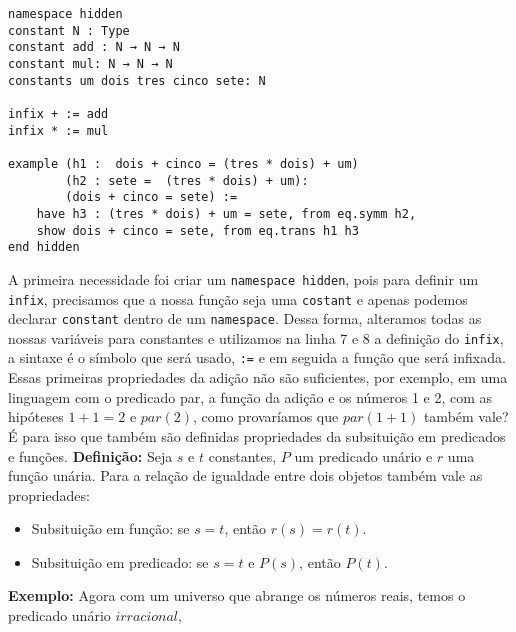 \begin{lstlisting}
namespace hidden
constant N : Type
constant add : N → N → N
constant mul: N → N → N
constants um dois tres cinco sete: N
    
infix + := add
infix * := mul
    
example (h1 :  dois + cinco = (tres * dois) + um) 
        (h2 : sete =  (tres * dois) + um): 
        (dois + cinco = sete) :=
    have h3 : (tres * dois) + um = sete, from eq.symm h2,
    show dois + cinco = sete, from eq.trans h1 h3
end hidden 
\end{lstlisting}
A primeira necessidade foi criar um \lstinline{namespace hidden}, pois para definir um \lstinline{infix},
precisamos que a nossa função seja uma \lstinline{costant} e apenas podemos declarar \lstinline{constant}
dentro de um \lstinline{namespace}. Dessa forma, alteramos todas as nossas variáveis para constantes e 
utilizamos na linha 7 e 8 a definição do \lstinline{infix}, a sintaxe é o símbolo que será usado, \lstinline{:=}
e em seguida a função que será infixada.
Essas primeiras propriedades da adição não são suficientes, por exemplo, em uma linguagem com o predicado
par, a função da adição e os números 1 e 2, com as hipóteses $1+1 =2$ e $par(2)$, como provaríamos que 
$par(1+1)$ também vale? É para isso que também são definidas propriedades da subsituição em predicados e funções.
\newline \textbf{Definição:} Seja $s$ e $t$ constantes, $P$ um predicado unário e $r$ uma função unária.
Para a relação de igualdade entre dois objetos também vale as propriedades:
\begin{itemize}
    \item Subsituição em função: se $s=t$, então $r(s) = r(t)$. 
    \item Subsituição em predicado: se $s=t$ e $P(s)$, então $P(t)$.
\end{itemize}
\begin{center}
    \begin{bprooftree}
    \end{bprooftree}
    \begin{bprooftree}
    \end{bprooftree}
\end{center}
\textbf{Exemplo:} Agora com um universo que abrange os números reais, temos o predicado unário $irracional$,

